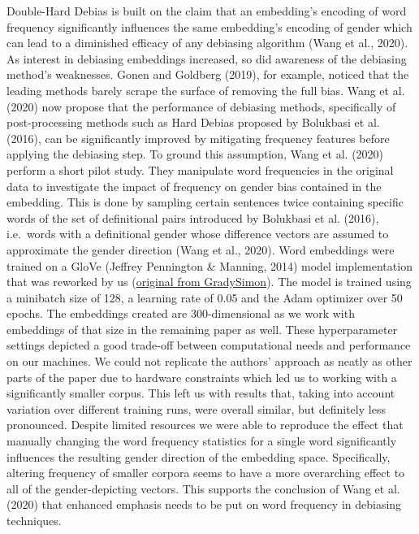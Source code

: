 \documentclass[
  english,
  man,floatsintext]{apa6}
\begin{document}
Double-Hard Debias is built on the claim that an embedding's encoding of word frequency significantly influences the same embedding's encoding of gender which can lead to a diminished efficacy of any debiasing algorithm (Wang et al., 2020). As interest in debiasing embeddings increased, so did awareness of the debiasing method's weaknesses. Gonen and Goldberg (2019), for example, noticed that the leading methods barely scrape the surface of removing the full bias. Wang et al. (2020) now propose that the performance of debiasing methods, specifically of post-processing methods such as Hard Debias proposed by Bolukbasi et al. (2016), can be significantly improved by mitigating frequency features before applying the debiasing step.
To ground this assumption, Wang et al. (2020) perform a short pilot study. They manipulate word frequencies in the original data to investigate the impact of frequency on gender bias contained in the embedding. This is done by sampling certain sentences twice containing specific words of the set of definitional pairs introduced by Bolukbasi et al. (2016), i.e.~words with a definitional gender whose difference vectors are assumed to approximate the gender direction (Wang et al., 2020).
Word embeddings were trained on a GloVe (Jeffrey Pennington \& Manning, 2014) model implementation that was reworked by us (\href{https://github.com/GradySimon/tensorflow-glove}{original from GradySimon}). The model is trained using a minibatch size of 128, a learning rate of 0.05 and the Adam optimizer over 50 epochs. The embeddings created are 300-dimensional as we work with embeddings of that size in the remaining paper as well. These hyperparameter settings depicted a good trade-off between computational needs and performance on our machines.
We could not replicate the authors' approach as neatly as other parts of the paper due to hardware constraints which led us to working with a significantly smaller corpus. This left us with results that, taking into account variation over different training runs, were overall similar, but definitely less pronounced.
Despite limited resources we were able to reproduce the effect that manually changing the word frequency statistics for a single word significantly influences the resulting gender direction of the embedding space. Specifically, altering frequency of smaller corpora seems to have a more overarching effect to all of the gender-depicting vectors. This supports the conclusion of Wang et al. (2020) that enhanced emphasis needs to be put on word frequency in debiasing techniques.
\end{document}
